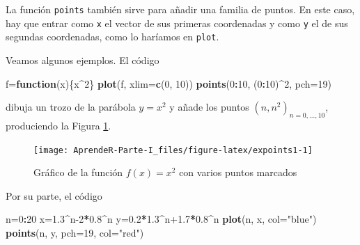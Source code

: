 \documentclass[]{book}
\newenvironment{Shaded}{\begin{snugshade}}{\end{snugshade}}
\newcommand{\ControlFlowTok}[1]{\textcolor[rgb]{0.13,0.29,0.53}{\textbf{#1}}}
\newcommand{\DataTypeTok}[1]{\textcolor[rgb]{0.13,0.29,0.53}{#1}}
\newcommand{\DecValTok}[1]{\textcolor[rgb]{0.00,0.00,0.81}{#1}}
\newcommand{\FloatTok}[1]{\textcolor[rgb]{0.00,0.00,0.81}{#1}}
\newcommand{\KeywordTok}[1]{\textcolor[rgb]{0.13,0.29,0.53}{\textbf{#1}}}
\newcommand{\NormalTok}[1]{#1}
\newcommand{\OperatorTok}[1]{\textcolor[rgb]{0.81,0.36,0.00}{\textbf{#1}}}
\newcommand{\StringTok}[1]{\textcolor[rgb]{0.31,0.60,0.02}{#1}}
\theoremstyle{definition}
\theoremstyle{definition}
\theoremstyle{definition}
\theoremstyle{remark}
\begin{document}
La función \texttt{points} también sirve para añadir una familia de puntos. En
este caso, hay que entrar como \texttt{x} el vector de sus primeras coordenadas y como \texttt{y} el de sus segundas coordenadas, como lo haríamos en \texttt{plot}.

Veamos algunos ejemplos. El código

\begin{Shaded}
\begin{Highlighting}[]
\NormalTok{f=}\ControlFlowTok{function}\NormalTok{(x)\{x}\OperatorTok{^}\DecValTok{2}\NormalTok{\}}
\KeywordTok{plot}\NormalTok{(f, }\DataTypeTok{xlim=}\KeywordTok{c}\NormalTok{(}\DecValTok{0}\NormalTok{, }\DecValTok{10}\NormalTok{))}
\KeywordTok{points}\NormalTok{(}\DecValTok{0}\OperatorTok{:}\DecValTok{10}\NormalTok{, (}\DecValTok{0}\OperatorTok{:}\DecValTok{10}\NormalTok{)}\OperatorTok{^}\DecValTok{2}\NormalTok{, }\DataTypeTok{pch=}\DecValTok{19}\NormalTok{)}
\end{Highlighting}
\end{Shaded}

dibuja un trozo de la parábola \(y=x^2\) y añade los puntos
\((n, n^2)_{n=0, \ldots, 10}\), produciendo la Figura \ref{fig:expoints1}.

\begin{figure}

{\centering \texttt{[image: AprendeR-Parte-I\_files/figure-latex/expoints1-1]} 

}

\caption{Gráfico de la función $f(x)=x^2$ con varios puntos marcados}\label{fig:expoints1}
\end{figure}

Por su parte, el código

\begin{Shaded}
\begin{Highlighting}[]
\NormalTok{n=}\DecValTok{0}\OperatorTok{:}\DecValTok{20}
\NormalTok{x=}\FloatTok{1.3}\OperatorTok{^}\NormalTok{n}\DecValTok{-2}\OperatorTok{*}\FloatTok{0.8}\OperatorTok{^}\NormalTok{n}
\NormalTok{y=}\FloatTok{0.2}\OperatorTok{*}\FloatTok{1.3}\OperatorTok{^}\NormalTok{n}\FloatTok{+1.7}\OperatorTok{*}\FloatTok{0.8}\OperatorTok{^}\NormalTok{n}
\KeywordTok{plot}\NormalTok{(n, x, }\DataTypeTok{col=}\StringTok{"blue"}\NormalTok{)}
\KeywordTok{points}\NormalTok{(n, y, }\DataTypeTok{pch=}\DecValTok{19}\NormalTok{, }\DataTypeTok{col=}\StringTok{"red"}\NormalTok{)}
\end{Highlighting}
\end{Shaded}
\end{document}
